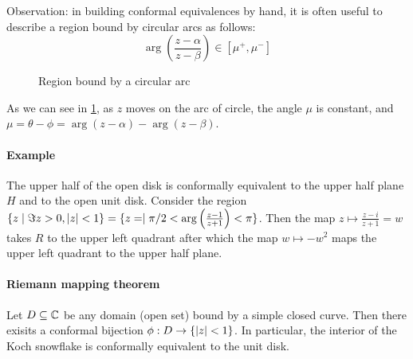 Observation: in building conformal equivalences by hand, it is often useful to describe a region bound by circular arcs as follows:
\[
\arg\left(\frac{z-\alpha}{z-\beta}\right) \in [\mu^+, \mu^-]
\]
\begin{figure}
  \centering
  \caption{Region bound by a circular arc}
  \label{fig:region_bound_by_circular_arc}
\end{figure}
As we can see in \cref{fig:region_bound_by_circular_arc}, as $z$ moves on the arc of circle, the angle $\mu$ is constant, and $\mu = \theta - \phi = \arg ( z - \alpha ) - \arg ( z - \beta )$.

\paragraph{Example}
The upper half of the open disk is conformally equivalent to the upper half plane $H$ and to the open unit disk. 
Consider the region $\{ z \mid \Im z > 0, \lvert z\rvert < 1 \} = \{ z = \mid \pi/2 < \arg \left(\frac{z-1}{z+1}\right) < \pi\}$. Then the map $z \mapsto \frac{z-i}{z+1} = w$ takes $R$ to the upper left quadrant after which the map $w \mapsto -w^2$ maps the upper left quadrant to the upper half plane.

\paragraph{Riemann mapping theorem}
Let $D \subseteq \mathbb{C}$ be any domain (open set) bound by a simple closed curve. Then there exisits a conformal bijection $\phi : D \rightarrow \{ \lvert z\rvert < 1 \}$. In particular, the interior of the Koch snowflake is conformally equivalent to the unit disk.



